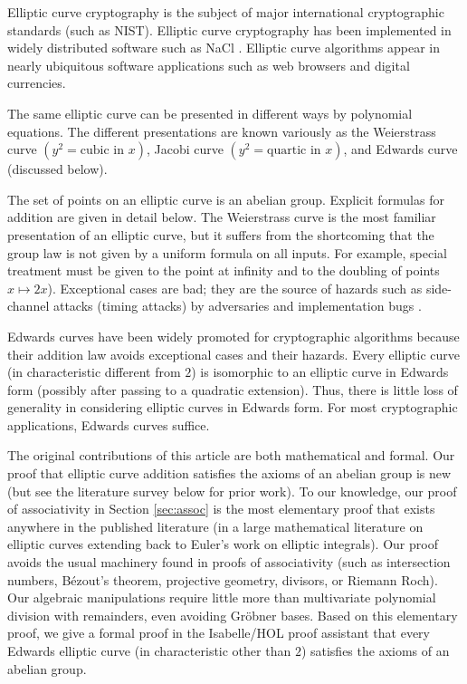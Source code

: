 \documentclass{llncs}
\begin{document}
Elliptic curve cryptography is the subject of major international
cryptographic standards (such as NIST).  Elliptic curve cryptography
has been implemented in widely distributed software such as NaCl
\cite{bernstein2012security}.  Elliptic curve algorithms appear in
nearly ubiquitous software applications such as web browsers and
digital currencies.

The same elliptic curve can be presented in different ways by
polynomial equations.  The different presentations are known variously
as the Weierstrass curve $(y^2 = \text{cubic in } x)$, Jacobi curve
$(y^2 = \text{quartic in } x)$, and Edwards curve (discussed below).

The set of points on an elliptic curve is an abelian group.  Explicit
formulas for addition are given in detail below.  The Weierstrass
curve is the most familiar presentation of an elliptic curve, but it
suffers from the shortcoming that the group law is not given by a
uniform formula on all inputs.  For example, special treatment must be
given to the point at infinity and to the doubling of points $x
\mapsto 2x$).  Exceptional cases are bad; they are the source of 
hazards such as side-channel attacks (timing attacks) by
adversaries and implementation bugs \cite{brier2002weierstrass}.

Edwards curves have been widely promoted for cryptographic algorithms
because their addition law avoids exceptional cases and their hazards.
Every elliptic curve (in characteristic different from $2$) is
isomorphic to an elliptic curve in Edwards form (possibly after
passing to a quadratic extension).  Thus, there is little loss of
generality in considering elliptic curves in Edwards form.  For most
cryptographic applications, Edwards curves suffice.



The original contributions of this article are both mathematical and
formal.  Our proof that elliptic curve addition satisfies the axioms
of an abelian group is new (but see the literature survey below for
prior work).  To our knowledge, our proof of
associativity in Section \ref{sec:assoc} is the most elementary proof
that exists anywhere in the published literature (in a large
mathematical literature on elliptic curves extending back to Euler's
work on elliptic integrals).  Our proof avoids the usual machinery
found in proofs of associativity (such as intersection numbers,
B\'ezout's theorem, projective geometry, divisors, or Riemann Roch).
Our algebraic manipulations require little more than multivariate
polynomial division with remainders, even avoiding Gr\"obner bases.
Based on this elementary proof, we give a formal proof in the
Isabelle/HOL proof assistant that every Edwards elliptic curve (in
characteristic other than $2$) satisfies the axioms of an abelian
group.
\end{document}
